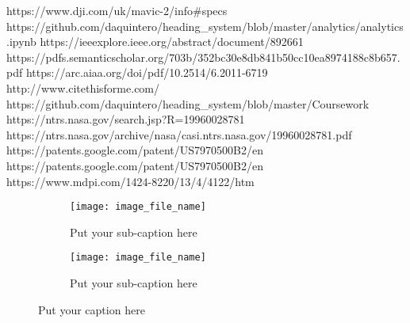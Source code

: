 https://www.dji.com/uk/mavic-2/info#specs
https://github.com/daquintero/heading_system/blob/master/analytics/analytics.ipynb
https://ieeexplore.ieee.org/abstract/document/892661
https://pdfs.semanticscholar.org/703b/352bc30e8db841b50cc10ea8974188c8b657.pdf
https://arc.aiaa.org/doi/pdf/10.2514/6.2011-6719
http://www.citethisforme.com/
https://github.com/daquintero/heading_system/blob/master/Coursework%
https://ntrs.nasa.gov/search.jsp?R=19960028781
https://ntrs.nasa.gov/archive/nasa/casi.ntrs.nasa.gov/19960028781.pdf
https://patents.google.com/patent/US7970500B2/en
https://patents.google.com/patent/US7970500B2/en
https://www.mdpi.com/1424-8220/13/4/4122/htm


\begin{figure}[ht]
\begin{subfigure}{.5\textwidth}
  \centering
  \texttt{[image: image\_file\_name]}  
  \caption{Put your sub-caption here}
  \label{fig:sub-first}
\end{subfigure}
\begin{subfigure}{.5\textwidth}
  \centering
  \texttt{[image: image\_file\_name]}  
  \caption{Put your sub-caption here}
  \label{fig:sub-second}
\end{subfigure}
\caption{Put your caption here}
\label{fig:fig}
\end{figure}
